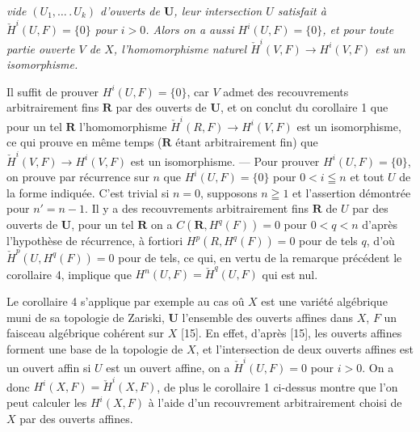 
\noindent\textit{vide $(U_1,\ldots\mathpunct{.}U_k)$ d'ouverts de $\mathbf U$, leur
intersection $U$ satisfait à $\check H^i(U,F)=\{0\}$ pour $i>0$. Alors on a
aussi $H^i(U,F)=\{0\}$, et pour toute partie ouverte $V$ de $X$,
l'homomorphisme naturel $\check H^i(V,F)\to H^i(V,F)$ est un
isomorphisme.}

Il suffit de prouver $H^i(U,F)=\{0\}$, car $V$ admet des recouvrements
arbitrairement fins $\mathbf R$ par des ouverts de $\mathbf U$, et on conclut
du corollaire 1 que pour un tel $\mathbf R$ l'homomorphisme
$\check H^i(R,F)\to H^i(V,F)$ est un isomorphisme, ce qui
prouve en même temps ($\mathbf R$ étant arbitrairement fin) que
$\check H^i(V,F)\to H^i(V,F)$ est un isomorphisme.
--- Pour prouver $H^i(U,F)=\{0\}$, on prouve par récurrence sur $n$ que
$H^i(U,F)=\{0\}$ pour $0<i\leqq n$ et tout $U$ de la forme indiquée. C'est
trivial si $n=0$, supposons $n\geqq 1$ et l'assertion démontrée pour
$n'=n-1$. Il y a des recouvrements arbitrairement fins $\mathbf R$ de $U$ par
des ouverts de $\mathbf U$, pour un tel $\mathbf R$ on a
$C(\mathbf R,H^q(F))=0$ pour $0<q<n$
d'après l'hypothèse de récurrence, à fortiori
$H^p(R,H^q(F))=0$ pour de tels $q$,
d'où
$\check H^p(U,H^q(F))=0$ pour de tels,
ce qui, en vertu de la remarque précédent le corollaire 4, implique que
$H^n(U,F)=\check H^q(U,F) $
qui est nul.

Le corollaire 4 s'applique par exemple au cas oû $X$ est une variété
algébrique muni de sa topologie de Zariski, $\mathbf U$ l'ensemble des ouverts
affines dans $X$, $F$ un faisceau algébrique cohérent sur $X$ [15]. En effet,
d'après [15], les ouverts affines forment une base de la topologie de $X$, et
l'intersection de deux ouverts affines est un ouvert affin si $U$ est un
ouvert affine, on a $\check H^i(U,F)=0$ pour $i>0$. On a donc
$H^i(X,F)=\check H^i(X,F)$,
de plus le corollaire 1 ci-dessus montre que l'on peut calculer les $H^i(X,F)$
à l'aide d'un recouvrement arbitrairement choisi de $X$ par des ouverts
affines.

